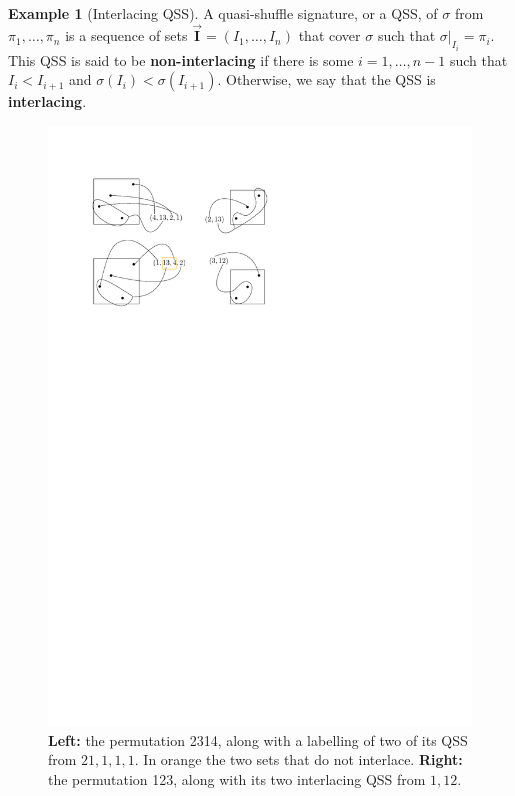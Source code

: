 \documentclass[12pt, reqno]{amsart}
\theoremstyle{definition}
\newtheorem{smpl}[thm]{Example}
\newcommand{\III}{\vec{\mathbf{I}}}
\begin{document}
\

\begin{smpl}[Interlacing QSS]
A quasi-shuffle signature, or a QSS, of $\sigma $ from $\pi_1, \dots, \pi_n$ is a sequence of sets $\III = (I_1, \dots, I_n)$ that cover $\sigma$ such that $\sigma|_{I_i} = \pi_i$.
This QSS is said to be \textbf{non-interlacing} if there is some $i=1, \dots, n-1$ such that $I_i < I_{i+1}$ and $\sigma(I_i) < \sigma(I_{i+1})$.
Otherwise, we say that the QSS is \textbf{interlacing}. 
\begin{figure}[h]
    \centering
    \includegraphics{images/interlacing_25314.pdf}
    \caption{\textbf{Left:} the permutation 2314, along with a labelling of two of its QSS from $21, 1, 1, 1$. In orange the two sets that do not interlace. \textbf{Right:} the permutation 123, along with its two interlacing QSS from $1, 12$.\label{fig:interlacingQSSsmpl}}
\end{figure}


\end{smpl}
\end{document}
